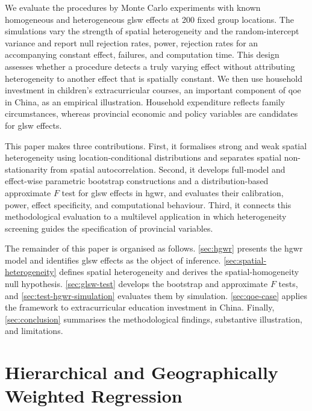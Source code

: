 \documentclass[times]{interact}
\theoremstyle{plain}%
\theoremstyle{definition}
\theoremstyle{remark}
\begin{document}
We evaluate the procedures by Monte Carlo experiments with known homogeneous and heterogeneous \gls{glsw} effects at 200 fixed group locations.
The simulations vary the strength of spatial heterogeneity and the random-intercept variance and report null rejection rates, power, rejection rates for an accompanying constant effect, failures, and computation time.
This design assesses whether a procedure detects a truly varying effect without attributing heterogeneity to another effect that is spatially constant.
We then use household investment in children's extracurricular courses, an important component of \gls{qoe} in China, as an empirical illustration.
Household expenditure reflects family circumstances, whereas provincial economic and policy variables are candidates for \gls{glsw} effects.

This paper makes three contributions.
First, it formalises strong and weak spatial heterogeneity using location-conditional distributions and separates spatial non-stationarity from spatial autocorrelation.
Second, it develops full-model and effect-wise parametric bootstrap constructions and a distribution-based approximate $F$ test for \gls{glsw} effects in \gls{hgwr}, and evaluates their calibration, power, effect specificity, and computational behaviour.
Third, it connects this methodological evaluation to a multilevel application in which heterogeneity screening guides the specification of provincial variables.

The remainder of this paper is organised as follows.
\autoref{sec:hgwr} presents the \gls{hgwr} model and identifies \gls{glsw} effects as the object of inference.
\autoref{sec:spatial-heterogeneity} defines spatial heterogeneity and derives the spatial-homogeneity null hypothesis.
\autoref{sec:glsw-test} develops the bootstrap and approximate $F$ tests, and \autoref{sec:test-hgwr-simulation} evaluates them by simulation.
\autoref{sec:qoe-case} applies the framework to extracurricular education investment in China.
Finally, \autoref{sec:conclusion} summarises the methodological findings, substantive illustration, and limitations.

\section{Hierarchical and Geographically Weighted Regression}\label{sec:hgwr}
\end{document}
